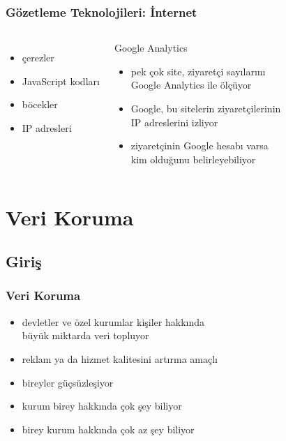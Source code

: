 \documentclass[dvipsnames]{beamer}
\theoremstyle{definition}
\theoremstyle{example}
\theoremstyle{plain}
\begin{document}
\begin{frame}
  \frametitle{Gözetleme Teknolojileri: İnternet}

  \begin{columns}[t]
    \begin{itemize}
      \item çerezler
      \item JavaScript kodları
      \item böcekler
      \item IP adresleri
    \end{itemize}

    \pause
    \begin{exampleblock}{Google Analytics}
      \begin{itemize}
        \item pek çok site, ziyaretçi sayılarını\\
          Google Analytics ile ölçüyor
        \item Google, bu sitelerin ziyaretçilerinin\\
          IP adreslerini izliyor
        \item ziyaretçinin Google hesabı varsa\\
          kim olduğunu belirleyebiliyor
      \end{itemize}
    \end{exampleblock}
  \end{columns}
\end{frame}

\section{Veri Koruma}

\subsection{Giriş}

\begin{frame}
  \frametitle{Veri Koruma}

  \begin{itemize}
    \item devletler ve özel kurumlar kişiler hakkında\\
      büyük miktarda veri topluyor
    \item reklam ya da hizmet kalitesini artırma amaçlı

    \bigskip
    \item bireyler güçsüzleşiyor
    \item kurum birey hakkında çok şey biliyor
    \item birey kurum hakkında çok az şey biliyor
  \end{itemize}
\end{frame}
\end{document}
